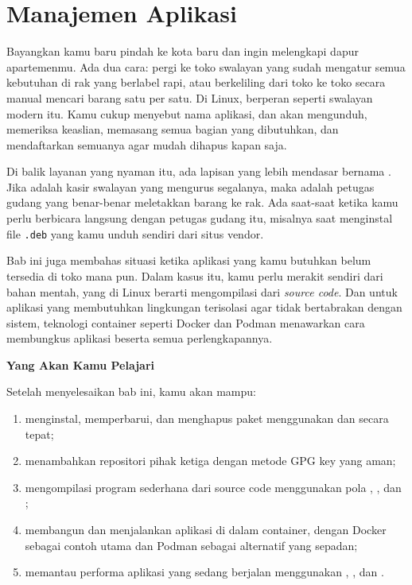 
\chapter{Manajemen Aplikasi}
\label{ch:application-management}

Bayangkan kamu baru pindah ke kota baru dan ingin melengkapi dapur apartemenmu.
Ada dua cara: pergi ke toko swalayan yang sudah mengatur semua kebutuhan di rak
yang berlabel rapi, atau berkeliling dari toko ke toko secara manual mencari
barang satu per satu. Di Linux,  berperan seperti swalayan modern itu.
Kamu cukup menyebut nama aplikasi, dan  akan mengunduh, memeriksa
keaslian, memasang semua bagian yang dibutuhkan, dan mendaftarkan semuanya agar
mudah dihapus kapan saja.

Di balik layanan  yang nyaman itu, ada lapisan yang lebih mendasar bernama
. Jika  adalah kasir swalayan yang mengurus segalanya, maka
 adalah petugas gudang yang benar-benar meletakkan barang ke rak. Ada
saat-saat ketika kamu perlu berbicara langsung dengan petugas gudang itu, misalnya
saat menginstal file \texttt{.deb} yang kamu unduh sendiri dari situs vendor.

Bab ini juga membahas situasi ketika aplikasi yang kamu butuhkan belum tersedia
di toko mana pun. Dalam kasus itu, kamu perlu merakit sendiri dari bahan mentah,
yang di Linux berarti mengompilasi dari \emph{source code}. Dan untuk aplikasi
 yang membutuhkan lingkungan terisolasi agar tidak bertabrakan dengan sistem,
 teknologi container seperti Docker dan Podman menawarkan cara membungkus
 aplikasi beserta semua perlengkapannya.

\textbf{Yang Akan Kamu Pelajari}

Setelah menyelesaikan bab ini, kamu akan mampu:

\begin{enumerate}
    \item menginstal, memperbarui, dan menghapus paket menggunakan  dan
         secara tepat;
    \item menambahkan repositori pihak ketiga dengan metode GPG key yang aman;
    \item mengompilasi program sederhana dari source code menggunakan pola
        , , dan ;
    \item membangun dan menjalankan aplikasi di dalam container, dengan Docker
        sebagai contoh utama dan Podman sebagai alternatif yang sepadan;
    \item memantau performa aplikasi yang sedang berjalan menggunakan ,
        , dan .
\end{enumerate}

